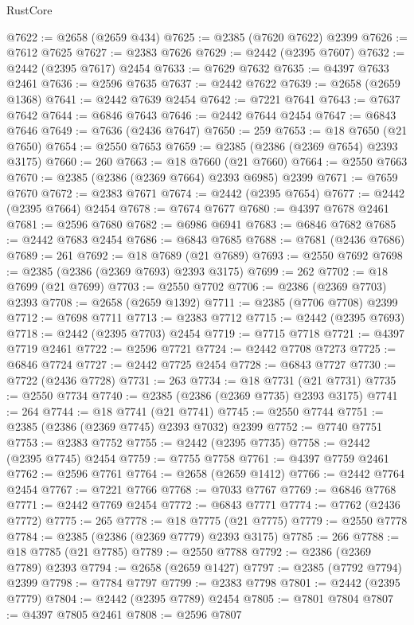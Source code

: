 \begin{lexlean}{RustCore}
\begin{coremodule}
@7622 := @2658 (@2659 @434)
@7625 := @2385 (@7620 @7622) @2399
@7626 := @7612 @7625
@7627 := @2383 @7626
@7629 := @2442 (@2395 @7607)
@7632 := @2442 (@2395 @7617) @2454
@7633 := @7629 @7632
@7635 := @4397 @7633 @2461
@7636 := @2596 @7635
@7637 := @2442 @7622
@7639 := @2658 (@2659 @1368)
@7641 := @2442 @7639 @2454
@7642 := @7221 @7641
@7643 := @7637 @7642
@7644 := @6846 @7643
@7646 := @2442 @7644 @2454
@7647 := @6843 @7646
@7649 := @7636 (@2436 @7647)
@7650 := 259
@7653 := @18 @7650 (@21 @7650)
@7654 := @2550 @7653
@7659 := @2385 (@2386 (@2369 @7654) @2393 @3175)
@7660 := 260
@7663 := @18 @7660 (@21 @7660)
@7664 := @2550 @7663
@7670 := @2385 (@2386 (@2369 @7664) @2393 @6985) @2399
@7671 := @7659 @7670
@7672 := @2383 @7671
@7674 := @2442 (@2395 @7654)
@7677 := @2442 (@2395 @7664) @2454
@7678 := @7674 @7677
@7680 := @4397 @7678 @2461
@7681 := @2596 @7680
@7682 := @6986 @6941
@7683 := @6846 @7682
@7685 := @2442 @7683 @2454
@7686 := @6843 @7685
@7688 := @7681 (@2436 @7686)
@7689 := 261
@7692 := @18 @7689 (@21 @7689)
@7693 := @2550 @7692
@7698 := @2385 (@2386 (@2369 @7693) @2393 @3175)
@7699 := 262
@7702 := @18 @7699 (@21 @7699)
@7703 := @2550 @7702
@7706 := @2386 (@2369 @7703) @2393
@7708 := @2658 (@2659 @1392)
@7711 := @2385 (@7706 @7708) @2399
@7712 := @7698 @7711
@7713 := @2383 @7712
@7715 := @2442 (@2395 @7693)
@7718 := @2442 (@2395 @7703) @2454
@7719 := @7715 @7718
@7721 := @4397 @7719 @2461
@7722 := @2596 @7721
@7724 := @2442 @7708 @7273
@7725 := @6846 @7724
@7727 := @2442 @7725 @2454
@7728 := @6843 @7727
@7730 := @7722 (@2436 @7728)
@7731 := 263
@7734 := @18 @7731 (@21 @7731)
@7735 := @2550 @7734
@7740 := @2385 (@2386 (@2369 @7735) @2393 @3175)
@7741 := 264
@7744 := @18 @7741 (@21 @7741)
@7745 := @2550 @7744
@7751 := @2385 (@2386 (@2369 @7745) @2393 @7032) @2399
@7752 := @7740 @7751
@7753 := @2383 @7752
@7755 := @2442 (@2395 @7735)
@7758 := @2442 (@2395 @7745) @2454
@7759 := @7755 @7758
@7761 := @4397 @7759 @2461
@7762 := @2596 @7761
@7764 := @2658 (@2659 @1412)
@7766 := @2442 @7764 @2454
@7767 := @7221 @7766
@7768 := @7033 @7767
@7769 := @6846 @7768
@7771 := @2442 @7769 @2454
@7772 := @6843 @7771
@7774 := @7762 (@2436 @7772)
@7775 := 265
@7778 := @18 @7775 (@21 @7775)
@7779 := @2550 @7778
@7784 := @2385 (@2386 (@2369 @7779) @2393 @3175)
@7785 := 266
@7788 := @18 @7785 (@21 @7785)
@7789 := @2550 @7788
@7792 := @2386 (@2369 @7789) @2393
@7794 := @2658 (@2659 @1427)
@7797 := @2385 (@7792 @7794) @2399
@7798 := @7784 @7797
@7799 := @2383 @7798
@7801 := @2442 (@2395 @7779)
@7804 := @2442 (@2395 @7789) @2454
@7805 := @7801 @7804
@7807 := @4397 @7805 @2461
@7808 := @2596 @7807

\end{coremodule}
\end{lexlean}
